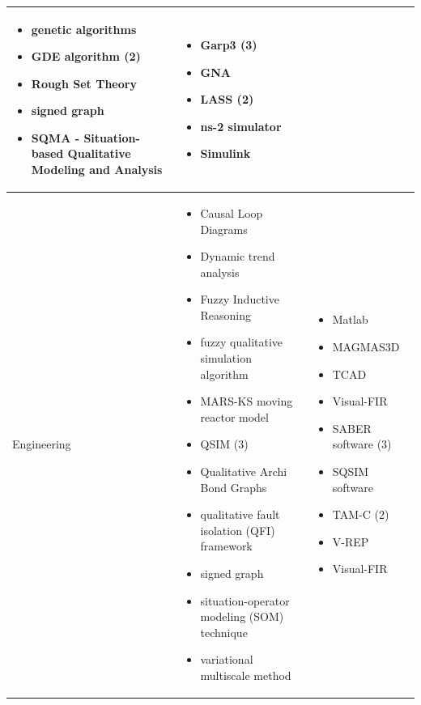 \documentclass[utf8]{gradu3}
\begin{document}
\begin{longtable}[h]{|p{4cm}|p{6cm}|p{5cm}|}
\begin{itemize}
        \item genetic algorithms
        \item GDE algorithm (2)
        \item Rough Set Theory
        \item signed graph
        \item SQMA - Situation-based Qualitative Modeling and Analysis
    \end{itemize} & 
    \begin{itemize}
        \item Garp3 (3)
        \item GNA
        \item LASS (2)
        \item ns-2 simulator
        \item Simulink
    \end{itemize}
    \\
    \hline
    Engineering & \begin{itemize}
        \item Causal Loop Diagrams
        \item Dynamic trend analysis
        \item Fuzzy Inductive Reasoning
        \item fuzzy qualitative simulation algorithm
        \item MARS-KS moving reactor model
        \item QSIM (3)
        \item Qualitative Archi Bond Graphs
        \item qualitative fault isolation (QFI) framework
        \item signed graph
        \item situation-operator modeling (SOM) technique
        \item variational multiscale method
    \end{itemize} &
    \begin{itemize}
        \item Matlab
        \item MAGMAS3D
        \item TCAD
        \item Visual-FIR
        \item SABER software (3)
        \item SQSIM software
        \item TAM-C (2)
        \item V-REP
        \item Visual-FIR

\end{itemize}
\end{longtable}
\end{document}

